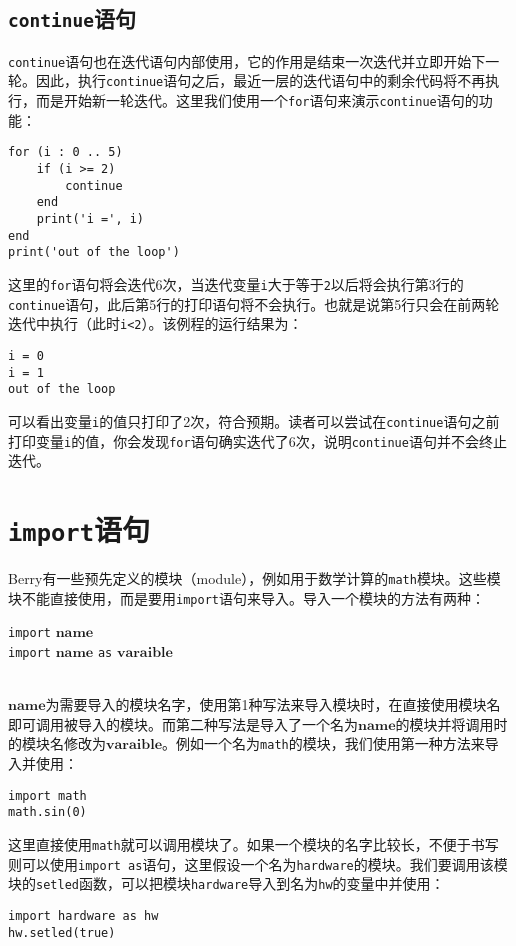 \subsection{\texttt{continue}语句}

\texttt{continue}语句也在迭代语句内部使用，它的作用是结束一次迭代并立即开始下一轮。因此，执行\texttt{continue}语句之后，最近一层的迭代语句中的剩余代码将不再执行，而是开始新一轮迭代。这里我们使用一个\texttt{for}语句来演示\texttt{continue}语句的功能：
\begin{lstlisting}[language=berry]
for (i : 0 .. 5)
    if (i >= 2)
        continue
    end
    print('i =', i)
end
print('out of the loop')
\end{lstlisting}
这里的\texttt{for}语句将会迭代6次，当迭代变量\texttt{i}大于等于\texttt{2}以后将会执行第3行的\texttt{continue}语句，此后第5行的打印语句将不会执行。也就是说第5行只会在前两轮迭代中执行（此时\texttt{i<2}）。该例程的运行结果为：
\begin{lstlisting}[numbers=none]
i = 0
i = 1
out of the loop
\end{lstlisting}
可以看出变量\texttt{i}的值只打印了2次，符合预期。读者可以尝试在\texttt{continue}语句之前打印变量\texttt{i}的值，你会发现\texttt{for}语句确实迭代了6次，说明\texttt{continue}语句并不会终止迭代。

\section{\texttt{import}语句}

Berry有一些预先定义的模块（module），例如用于数学计算的\texttt{math}模块。这些模块不能直接使用，而是要用\texttt{import}语句来导入。导入一个模块的方法有两种：
\begin{algorithm}
    \texttt{import} $\bm{name}$ \\
    \texttt{import} $\bm{name}$ \texttt{as} $\bm{varaible}$
\end{algorithm}\vspace{-0.6em}\\
$\bm{name}$为需要导入的模块名字，使用第1种写法来导入模块时，在直接使用模块名即可调用被导入的模块。而第二种写法是导入了一个名为$\bm{name}$的模块并将调用时的模块名修改为$\bm{varaible}$。例如一个名为\texttt{math}的模块，我们使用第一种方法来导入并使用：
\begin{lstlisting}[language=berry, numbers=none]
import math
math.sin(0)
\end{lstlisting}
这里直接使用\texttt{math}就可以调用模块了。如果一个模块的名字比较长，不便于书写则可以使用\texttt{import as}语句，这里假设一个名为\texttt{hardware}的模块。我们要调用该模块的\texttt{setled}函数，可以把模块\texttt{hardware}导入到名为\texttt{hw}的变量中并使用：
\begin{lstlisting}[language=berry, numbers=none]
import hardware as hw
hw.setled(true)
\end{lstlisting}
